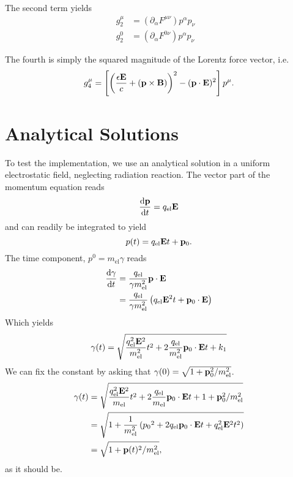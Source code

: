 \documentclass[10pt,letterpaper,extrafontsizes, onecolumn,openright]{memoir}
\begin{document}
The second term yields
  \begin{align*}
    g_2^\mu &= \left(\partial_\alpha F^{\mu\nu}\right)p^\alpha p_\nu & \\
    g_2^0   &= \left(\partial_\alpha F^{0\nu}\right)p^\alpha p_\nu   &
  \end{align*}

The fourth is simply the squared magnitude of the Lorentz force vector, i.e.
  \begin{equation}
    g_4^\mu = \left[\left(\frac{\epsilon\vb{E}}{c}+\left(\vb{p}\times\vb{B}\right)\right)^2-(\vb{p}\cdot\vb{E})^2\right] p^\mu.
  \end{equation}

\section{Analytical Solutions}

To test the implementation, we use an analytical solution in a uniform electrostatic field,
neglecting radiation reaction.
The vector part of the momentum equation reads
	\begin{equation}
		\dv{\vb{p}}{t} = q_\text{el}\vb{E}
	\end{equation}
and can readily be integrated to yield
	\begin{equation}
		p(t) = q_\text{el}\vb{E}t+\vb{p}_0.
	\end{equation}
The time component, $p^0=m_\text{el}\gamma$ reads
	\begin{align}
		\dv{\gamma}{t} &= \frac{q_\text{el}}{\gamma m_\text{el}^2}\vb{p}\cdot\vb{E} \\
		               &= \frac{q_\text{el}}{\gamma m_\text{el}^2}\left(q_\text{el}\vb{E}^2 t + \vb{p}_0\cdot\vb{E}\right)
	\end{align}
Which yields
	\begin{equation}
		\gamma(t) = \sqrt{\frac{q_\text{el}^2\vb{E}^2}{ m_\text{el}^2}t^2+2\frac{q_\text{el}}{m_\text{el}^2}\vb{p}_0\cdot\vb{E}t+k_1}
	\end{equation}
We can fix the constant by asking that $\gamma(0)=\sqrt{1+\vb{p}_0^2/m_\text{el}^2}$.
	\begin{align}
		\gamma(t) &= \sqrt{\frac{q_\text{el}^2\vb{E}^2}{ m_\text{el}}t^2+2\frac{q_\text{el}}{ m_\text{el}}\vb{p}_0\cdot\vb{E}t+1+\vb{p}_0^2/m_\text{el}^2}\\
		          &= \sqrt{1+\frac{1}{m_\text{el}^2}\left({p_0}^2+2q_\text{el}\vb{p}_0\cdot\vb{E}t+q_\text{el}^2\vb{E}^2t^2\right)} \\
		          &= \sqrt{1+\vb{p}(t)^2/m_\text{el}^2},
	\end{align}
as it should be.
\end{document}
